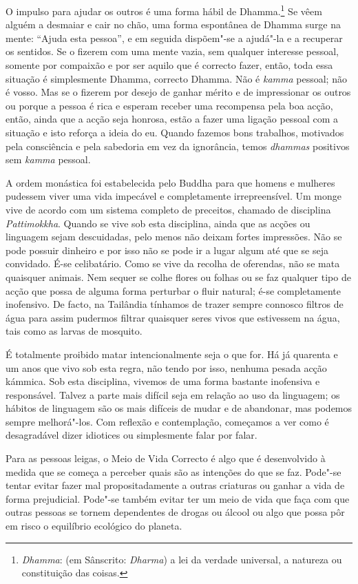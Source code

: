 O impulso para ajudar os outros é uma forma hábil de Dhamma.\footnote{%
  \emph{Dhamma}: (em Sânscrito: \emph{Dharma}) a lei da verdade universal, a
  natureza ou constituição das coisas.} Se vêem alguém a desmaiar e cair no chão,
uma forma espontânea de Dhamma surge na mente: “Ajuda esta pessoa”, e em seguida
dispõem"-se a ajudá"-la e a recuperar os sentidos. Se o fizerem com uma mente vazia,
sem qualquer interesse pessoal, somente por compaixão e por ser aquilo que é
correcto fazer, então, toda essa situação é simplesmente Dhamma, correcto
Dhamma. Não é \emph{kamma} pessoal; não é vosso. Mas se o fizerem por desejo de
ganhar mérito e de impressionar os outros ou porque a pessoa é rica e esperam
receber uma recompensa pela boa acção, então, ainda que a acção seja honrosa,
estão a fazer uma ligação pessoal com a situação e isto reforça a ideia do eu.
Quando fazemos bons trabalhos, motivados pela consciência e pela sabedoria em
vez da ignorância, temos \emph{dhammas} positivos sem \emph{kamma} pessoal.

A ordem monástica foi estabelecida pelo Buddha para que homens e mulheres
pudessem viver uma vida impecável e completamente irrepreensível. Um monge vive
de acordo com um sistema completo de preceitos, chamado de disciplina
\emph{Pattimokkha}. Quando se vive sob esta disciplina, ainda que as acções ou
linguagem sejam descuidadas, pelo menos não deixam fortes impressões. Não se
pode possuir dinheiro e por isso não se pode ir a lugar algum até que se seja
convidado. É-se celibatário. Como se vive da recolha de oferendas, não se mata
quaisquer animais. Nem sequer se colhe flores ou folhas ou se faz qualquer tipo
de acção que possa de alguma forma perturbar o fluir natural; é-se completamente
inofensivo. De facto, na Tailândia tínhamos de trazer sempre connosco filtros de
água para assim pudermos filtrar quaisquer seres vivos que estivessem na água,
tais como as larvas de mosquito.

É totalmente proibido matar intencionalmente seja o que for. Há já quarenta e um
anos que vivo sob esta regra, não tendo por isso, nenhuma pesada acção kámmica.
Sob esta disciplina, vivemos de uma forma bastante inofensiva e responsável.
Talvez a parte mais difícil seja em relação ao uso da linguagem; os hábitos de
linguagem são os mais difíceis de mudar e de abandonar, mas podemos sempre
melhorá"-los. Com reflexão e contemplação, começamos a ver como é desagradável
dizer idiotices ou simplesmente falar por falar.

Para as pessoas leigas, o Meio de Vida Correcto é algo que é desenvolvido à
medida que se começa a perceber quais são as intenções do que se faz. Pode"-se
tentar evitar fazer mal propositadamente a outras criaturas ou ganhar a vida de
forma prejudicial. Pode"-se também evitar ter um meio de vida que faça com que
outras pessoas se tornem dependentes de drogas ou álcool ou algo que possa pôr
em risco o equilíbrio ecológico do planeta.

